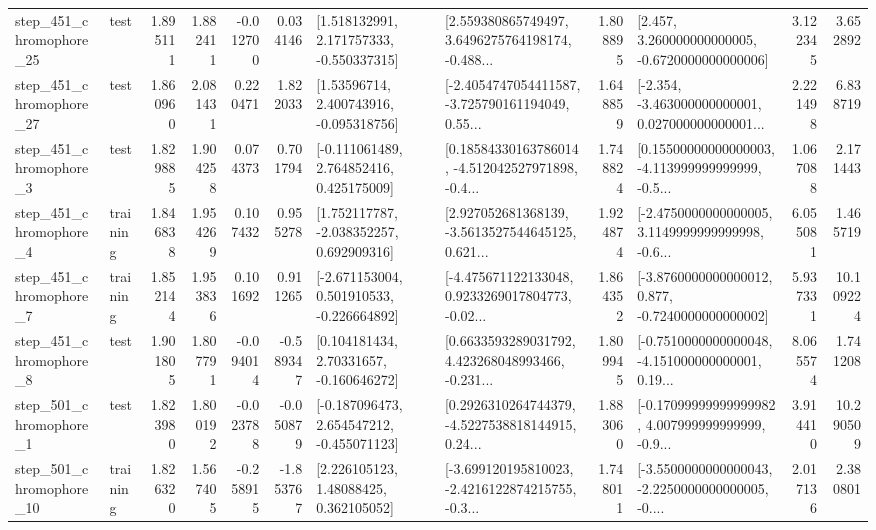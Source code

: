 \begin{tabular}{llrrrrllrlrr}
  step\_451\_chromophore\_25 &      test &      1.895111 &    1.882411 &     -0.012700 &  0.034146 &    [1.518132991, 2.171757333, -0.550337315] &  [2.559380865749497, 3.6496275764198174, -0.488... &       1.808895 &    [2.457, 3.260000000000005, -0.6720000000000006] &            3.122345 &          3.652892 \\
  step\_451\_chromophore\_27 &      test &      1.860960 &    2.081431 &      0.220471 &  1.822033 &     [1.53596714, 2.400743916, -0.095318756] &  [-2.4054747054411587, -3.725790161194049, 0.55... &       1.648859 &  [-2.354, -3.463000000000001, 0.027000000000001... &            2.221498 &          6.838719 \\
   step\_451\_chromophore\_3 &      test &      1.829885 &    1.904258 &      0.074373 &  0.701794 &    [-0.111061489, 2.764852416, 0.425175009] &  [0.18584330163786014, -4.512042527971898, -0.4... &       1.748824 &  [0.15500000000000003, -4.113999999999999, -0.5... &            1.067088 &          2.171443 \\
   step\_451\_chromophore\_4 &  training &      1.846838 &    1.954269 &      0.107432 &  0.955278 &    [1.752117787, -2.038352257, 0.692909316] &  [2.927052681368139, -3.5613527544645125, 0.621... &       1.924874 &  [-2.4750000000000005, 3.1149999999999998, -0.6... &            6.055081 &          1.465719 \\
   step\_451\_chromophore\_7 &  training &      1.852144 &    1.953836 &      0.101692 &  0.911265 &   [-2.671153004, 0.501910533, -0.226664892] &  [-4.475671122133048, 0.9233269017804773, -0.02... &       1.864352 &  [-3.8760000000000012, 0.877, -0.7240000000000002] &            5.937331 &         10.109224 \\
   step\_451\_chromophore\_8 &      test &      1.901805 &    1.807791 &     -0.094014 & -0.589347 &     [0.104181434, 2.70331657, -0.160646272] &  [0.6633593289031792, 4.423268048993466, -0.231... &       1.809945 &  [-0.7510000000000048, -4.151000000000001, 0.19... &            8.065574 &          1.741208 \\
   step\_501\_chromophore\_1 &      test &      1.823980 &    1.800192 &     -0.023788 & -0.050879 &   [-0.187096473, 2.654547212, -0.455071123] &  [0.2926310264744379, -4.5227538818144915, 0.24... &       1.883060 &  [-0.17099999999999982, 4.007999999999999, -0.9... &            3.914410 &         10.290509 \\
  step\_501\_chromophore\_10 &  training &      1.826320 &    1.567405 &     -0.258915 & -1.853767 &      [2.226105123, 1.48088425, 0.362105052] &  [-3.699120195810023, -2.4216122874215755, -0.3... &       1.748011 &  [-3.5500000000000043, -2.2250000000000005, -0.... &            2.017136 &          2.380801 \\

\end{tabular}
